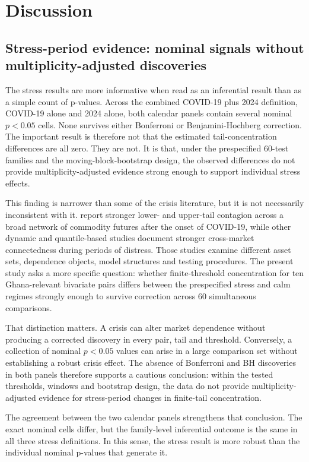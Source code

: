 \section{Discussion}
\label{sec:discussion}

\subsection{Stress-period evidence: nominal signals without multiplicity-adjusted discoveries}

The stress results are more informative when read as an inferential result than as a simple count of p-values. Across the combined COVID-19 plus 2024 definition, COVID-19 alone and 2024 alone, both calendar panels contain several nominal \(p<0.05\) cells. None survives either Bonferroni or Benjamini-Hochberg correction. The important result is therefore not that the estimated tail-concentration differences are all zero. They are not. It is that, under the prespecified 60-test families and the moving-block-bootstrap design, the observed differences do not provide multiplicity-adjusted evidence strong enough to support individual stress effects.

This finding is narrower than some of the crisis literature, but it is not necessarily inconsistent with it. \citet{qiao2023} report stronger lower- and upper-tail contagion across a broad network of commodity futures after the onset of COVID-19, while other dynamic and quantile-based studies document stronger cross-market connectedness during periods of distress. Those studies examine different asset sets, dependence objects, model structures and testing procedures. The present study asks a more specific question: whether finite-threshold concentration for ten Ghana-relevant bivariate pairs differs between the prespecified stress and calm regimes strongly enough to survive correction across 60 simultaneous comparisons.

That distinction matters. A crisis can alter market dependence without producing a corrected discovery in every pair, tail and threshold. Conversely, a collection of nominal \(p<0.05\) values can arise in a large comparison set without establishing a robust crisis effect. The absence of Bonferroni and BH discoveries in both panels therefore supports a cautious conclusion: within the tested thresholds, windows and bootstrap design, the data do not provide multiplicity-adjusted evidence for stress-period changes in finite-tail concentration.

The agreement between the two calendar panels strengthens that conclusion. The exact nominal cells differ, but the family-level inferential outcome is the same in all three stress definitions. In this sense, the stress result is more robust than the individual nominal p-values that generate it.

